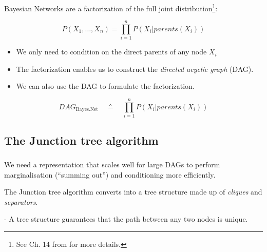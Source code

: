 \begin{frame}\frametitle{\secname}
  
Bayesian Networks are a factorization of the full joint distribution\footnote{See Ch. 14 from \citep{russell2016artificial} for more details.}:

\begin{equation}
P(X_{1},\ldots,X_{n}) = \prod_{i=1}^{n} P(X_{i} | parents(X_{i}))
\end{equation}
    
\begin{itemize}
\item We only need to condition on the direct parents of any node $X_i$

\pause 
\item The factorization enables us to construct the \emph{directed acyclic graph} (DAG).
\item We can also use the DAG to formulate the factorization.
\end{itemize}

\begin{equation}
\mathit{DAG}_{\text{Bayes.Net}} \quad \corresponds \quad \prod_{i=1}^{n} P(X_{i} | parents(X_{i}))
\end{equation}
    
\end{frame}

\subsection{The Junction tree algorithm}

\begin{frame}\frametitle{\subsecname}

We need a representation that scales well for large DAGs to perform marginalisation (``summing out'') and conditioning more efficiently.

The Junction tree algorithm converts into a tree structure made up of \emph{cliques} and \emph{separators}.


\pause

- A tree structure guarantees that the path between any two nodes is unique.

\end{frame}

